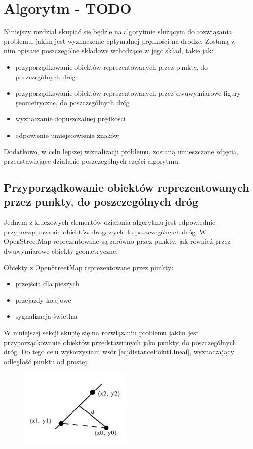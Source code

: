\chapter{Algorytm - TODO}
\label{cha:Algorytm}

Niniejszy rozdział skupiać się będzie na algorytmie służącym do rozwiązania problemu, jakim jest wyznaczenie optymalnej prędkości na drodze. Zostaną w nim opisane poszczególne składowe wchodzące w jego skład, takie jak:
\begin{itemize}
\item przyporządkowanie obiektów reprezentowanych przez punkty, do poszczególnych dróg
\item przyporządkowanie obiektów reprezentowanych przez dwuwymiarowe figury geometryczne, do poszczególnych dróg
\item wyznaczanie dopuszczalnej prędkości
\item odpowienie umiejscowienie znaków
\end{itemize}

Dodatkowo, w celu lepszej wizualizacji problemu, zostaną umieszczone zdjęcia, przedstawiające działanie poszczególnych części algorytmu.

\newpage
\section{Przyporządkowanie obiektów reprezentowanych przez punkty, do poszczególnych dróg}
\label{sec:ObiektyPunktDrogi}

Jednym z kluczowych elementów działania algorytmu jest odpowiednie przyporządkowanie obiektów drogowych do poszczególnych dróg. W OpenStreetMap reprezentowane są zarówno przez punkty, jak również przez dwuwymiarowe obiekty geometryczne. 


Obiekty z OpenStreetMap reprezentowane przez punkty:
\begin{itemize}
\item przejścia dla pieszych
\item przejazdy kolejowe
\item sygnalizacja świetlna
\end{itemize}


W niniejszej sekcji skupię się na rozwiązaniu problemu jakim jest przyporządkowanie obiektów przedstawianych jako punkty, do poszczególnych dróg. Do tego celu wykorzystam wzór \ref{eq:distancePointLineal}, wyznaczający odległość punktu od prostej.

\begin{figure}[h]
\label{odlegloscPktProsta}
\centering
\includegraphics[width=0.5\textwidth]{dlugoscPktOdProstej}
\end{figure}

